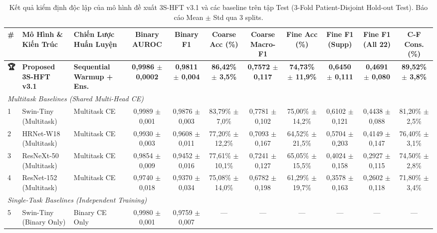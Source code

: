 \begin{table}[t]
\centering
\small
\caption{Kết quả kiểm định độc lập của mô hình đề xuất 3S-HFT v3.1 và các baseline trên tập Test (3-Fold Patient-Disjoint Hold-out Test). Báo cáo Mean $\pm$ Std qua 3 splits.}
\label{tab:test_benchmark}
\begin{adjustbox}{width=\textwidth}
\begin{tabular}{lllcccccccc}
\toprule
\textbf{\#} & \textbf{Mô Hình \& Kiến Trúc} & \textbf{Chiến Lược Huấn Luyện} & \textbf{Binary AUROC} & \textbf{Binary F1} & \textbf{Coarse Acc (\%)} & \textbf{Coarse Macro-F1} & \textbf{Fine Acc (\%)} & \textbf{Fine F1 (Supp)} & \textbf{Fine F1 (All 22)} & \textbf{C-F Cons. (\%)} \\
\midrule
\textbf{🏆} & \textbf{Proposed 3S-HFT v3.1} & \textbf{Sequential Warmup + Ens.} & \textbf{0,9986 $\pm$ 0,0002} & \textbf{0,9811 $\pm$ 0,004} & \textbf{86,42\% $\pm$ 3,5\%} & \textbf{0,7572 $\pm$ 0,117} & \textbf{74,73\% $\pm$ 11,9\%} & \textbf{0,6450 $\pm$ 0,111} & \textbf{0,4691 $\pm$ 0,080} & \textbf{89,52\% $\pm$ 3,8\%} \\
\midrule
\multicolumn{11}{l}{\textit{Multitask Baselines (Shared Multi-Head CE)}} \\
1 & Swin-Tiny (Multitask) & Multitask CE & 0,9989 $\pm$ 0,001 & 0,9876 $\pm$ 0,003 & 83,79\% $\pm$ 7,0\% & 0,7781 $\pm$ 0,102 & 75,00\% $\pm$ 14,2\% & 0,6102 $\pm$ 0,121 & 0,4438 $\pm$ 0,088 & 81,20\% $\pm$ 2,5\% \\
2 & HRNet-W18 (Multitask) & Multitask CE & 0,9930 $\pm$ 0,003 & 0,9608 $\pm$ 0,011 & 77,20\% $\pm$ 12,2\% & 0,7093 $\pm$ 0,167 & 64,52\% $\pm$ 21,5\% & 0,5704 $\pm$ 0,203 & 0,4149 $\pm$ 0,147 & 76,40\% $\pm$ 3,1\% \\
3 & ResNeXt-50 (Multitask) & Multitask CE & 0,9854 $\pm$ 0,009 & 0,9452 $\pm$ 0,016 & 77,61\% $\pm$ 10,1\% & 0,7241 $\pm$ 0,127 & 65,05\% $\pm$ 15,5\% & 0,4024 $\pm$ 0,158 & 0,2927 $\pm$ 0,115 & 74,50\% $\pm$ 2,8\% \\
4 & ResNet-152 (Multitask) & Multitask CE & 0,9740 $\pm$ 0,018 & 0,9370 $\pm$ 0,034 & 75,08\% $\pm$ 14,0\% & 0,6782 $\pm$ 0,198 & 61,29\% $\pm$ 19,7\% & 0,3578 $\pm$ 0,163 & 0,2602 $\pm$ 0,118 & 71,80\% $\pm$ 3,4\% \\
\midrule
\multicolumn{11}{l}{\textit{Single-Task Baselines (Independent Training)}} \\
5 & Swin-Tiny (Binary Only) & Binary CE Only & 0,9980 $\pm$ 0,001 & 0,9759 $\pm$ 0,007 & --- & --- & --- & --- & --- & --- \\

\end{tabular}
\end{adjustbox}
\end{table}
